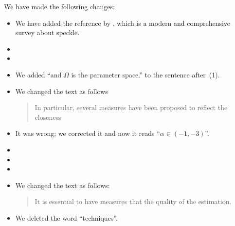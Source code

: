 \documentclass{ar2rc}
\begin{document}
\AR We have made the following changes:
\begin{itemize}
\item We have added the reference by \citet{SARImageStatisticalModelingPartISinglePixelStatisticalModels}, which is a modern and comprehensive survey about speckle.
\item 
\item 
\item We added ``and $\Omega$ is the parameter space.'' to the sentence after~(1).
\item We changed the text as follows
		\begin{quote}
	In particular, several measures have been proposed to reflect the closeness  \DIFdelbegin {} \DIFdelend \DIFaddbegin {}\DIFaddend
		\end{quote}
\item It was wrong; we corrected it and now it reads ``$\alpha \in (-1,-3)$''.
\item 
\item 
\item 
\item We changed the text as follows:
	\begin{quote}		
	It is essential to have measures that \DIFdelbegin {} \DIFdelend \DIFaddbegin {}\DIFaddend the quality of the estimation. 
	\end{quote}
\item We deleted the word ``techniques''.
\end{itemize}



	
\end{document}
